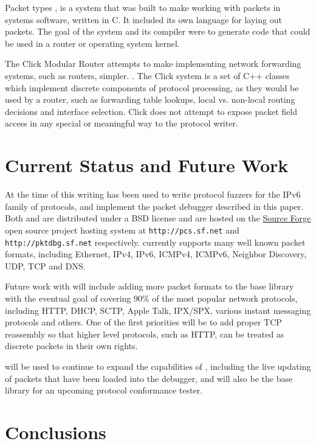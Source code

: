 \documentclass{sig-alternate-10pt}
\begin{document}
Packet types \cite{mccann:sigcomm00}, is a system that was built to
make working with packets in systems software, written in C.  It
included its own language for laying out packets.  The goal of the
system and its compiler were to generate code that could be used in a
router or operating system kernel.

The Click Modular Router \cite{kohler:tocs00} attempts to make
implementing network forwarding systems, such as routers, simpler. .
The Click system is a set of C++ classes which implement discrete
components of protocol processing, as they would be used by a router,
such as forwarding table lookups, local vs. non-local routing
decisions and interface selection.  Click does not attempt to expose
packet field access in any special or meaningful way to the protocol
writer.

\section{Current Status and Future Work}
\label{sec:future-work}

At the time of this writing  has been used to write
protocol fuzzers for the IPv6 family of protocols, and implement the
packet debugger described in this paper.  Both  and
 are distributed under a BSD license and are hosted on
the \href{http://www.sf.net}{Source Forge} open source project hosting
system at \verb|http://pcs.sf.net| and \verb|http://pktdbg.sf.net|
respectively.   currently supports many well known packet
formats, including Ethernet, IPv4, IPv6, ICMPv4, ICMPv6, Neighbor
Discovery, UDP, TCP and DNS.

Future work with  will include adding more packet formats
to the base library with the eventual goal of covering 90\% of the
most popular network protocols, including HTTP, DHCP, SCTP, Apple
Talk, IPX/SPX, various instant messaging protocols and others.  One of
the first priorities will be to add proper TCP reassembly so that
higher level protocols, such as HTTP, can be treated as discrete
packets in their own rights.

 will be used to continue to expand the capabilities of
, including the live updating of packets that have been
loaded into the debugger, and will also be the base library for an
upcoming protocol conformance tester.

\section{Conclusions}
\label{sec:conclusions}
\end{document}
